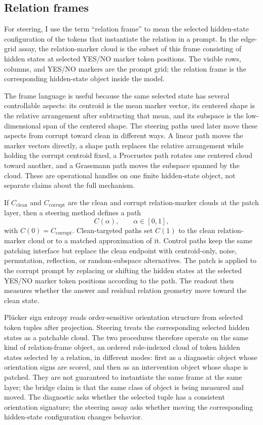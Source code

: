 \documentclass[11pt]{article}
\newcommand{\clean}{\mathrm{clean}}
\newcommand{\corr}{\mathrm{corrupt}}
\begin{document}
\subsection{Relation frames}

For steering, I use the term ``relation frame'' to mean the selected hidden-state configuration of the tokens that instantiate the relation in a prompt. In the edge-grid assay, the relation-marker cloud is the subset of this frame consisting of hidden states at selected YES/NO marker token positions. The visible rows, columns, and YES/NO markers are the prompt grid; the relation frame is the corresponding hidden-state object inside the model.

The frame language is useful because the same selected state has several controllable aspects: its centroid is the mean marker vector, its centered shape is the relative arrangement after subtracting that mean, and its subspace is the low-dimensional span of the centered shape. The steering paths used later move these aspects from corrupt toward clean in different ways. A linear path moves the marker vectors directly, a shape path replaces the relative arrangement while holding the corrupt centroid fixed, a Procrustes path rotates one centered cloud toward another, and a Grassmann path moves the subspace spanned by the cloud. These are operational handles on one finite hidden-state object, not separate claims about the full mechanism.

If $C_{\clean}$ and $C_{\corr}$ are the clean and corrupt relation-marker clouds at the patch layer, then a steering method defines a path
\begin{equation}
C(\alpha), \qquad \alpha \in [0,1],
\end{equation}
with $C(0)=C_{\corr}$. Clean-targeted paths set $C(1)$ to the clean relation-marker cloud or to a matched approximation of it. Control paths keep the same patching interface but replace the clean endpoint with centroid-only, noise, permutation, reflection, or random-subspace alternatives. The patch is applied to the corrupt prompt by replacing or shifting the hidden states at the selected YES/NO marker token positions according to the path. The readout then measures whether the answer and residual relation geometry move toward the clean state.

Pl\"ucker sign entropy reads order-sensitive orientation structure from selected token tuples after projection. Steering treats the corresponding selected hidden states as a patchable cloud. The two procedures therefore operate on the same kind of relation-frame object, an ordered role-indexed cloud of token hidden states selected by a relation, in different modes: first as a diagnostic object whose orientation signs are scored, and then as an intervention object whose shape is patched. They are not guaranteed to instantiate the same frame at the same layer; the bridge claim is that the same class of object is being measured and moved. The diagnostic asks whether the selected tuple has a consistent orientation signature; the steering assay asks whether moving the corresponding hidden-state configuration changes behavior.
\end{document}
